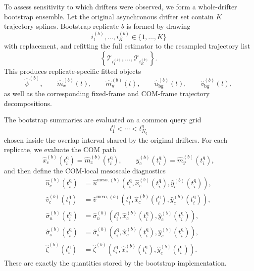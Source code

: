 \documentclass{article}
\begin{document}
To assess sensitivity to which drifters were observed, we form a
whole-drifter bootstrap ensemble. Let the original asynchronous drifter
set contain $K$ trajectory splines. Bootstrap replicate $b$ is formed by
drawing
\begin{equation}
i_1^{(b)}, \dots, i_K^{(b)} \in \{1,\dots,K\}
\end{equation}
with replacement, and refitting the full estimator to the resampled
trajectory list
\begin{equation}
\left\{\mathcal{T}_{i_1^{(b)}}, \dots, \mathcal{T}_{i_K^{(b)}}\right\}.
\end{equation}
This produces replicate-specific fitted objects
\begin{equation}
\hat{\psi}^{(b)}, \qquad \hat{m}_x^{(b)}(t), \qquad \hat{m}_y^{(b)}(t),
\qquad \hat{u}_{\mathrm{bg}}^{(b)}(t), \qquad \hat{v}_{\mathrm{bg}}^{(b)}(t),
\end{equation}
as well as the corresponding fixed-frame and COM-frame trajectory
decompositions.

The bootstrap summaries are evaluated on a common query grid
\begin{equation}
t_1^{\mathrm{q}} < \cdots < t_{N_q}^{\mathrm{q}}
\end{equation}
chosen inside the overlap interval shared by the original drifters. For
each replicate, we evaluate the COM path
\begin{equation}
\hat{x}_c^{(b)}(t_i^{\mathrm{q}})=\hat{m}_x^{(b)}(t_i^{\mathrm{q}}),
\qquad
\hat{y}_c^{(b)}(t_i^{\mathrm{q}})=\hat{m}_y^{(b)}(t_i^{\mathrm{q}}),
\end{equation}
and then define the COM-local mesoscale diagnostics
\begin{align}
\hat{u}_c^{(b)}(t_i^{\mathrm{q}})
&=
\hat{u}^{\mathrm{meso},(b)}\!\left(
t_i^{\mathrm{q}},
\hat{x}_c^{(b)}(t_i^{\mathrm{q}}),
\hat{y}_c^{(b)}(t_i^{\mathrm{q}})
\right),
\\
\hat{v}_c^{(b)}(t_i^{\mathrm{q}})
&=
\hat{v}^{\mathrm{meso},(b)}\!\left(
t_i^{\mathrm{q}},
\hat{x}_c^{(b)}(t_i^{\mathrm{q}}),
\hat{y}_c^{(b)}(t_i^{\mathrm{q}})
\right),
\\
\hat{\sigma}_n^{(b)}(t_i^{\mathrm{q}})
&=
\hat{\sigma}_n^{(b)}\!\left(
t_i^{\mathrm{q}},
\hat{x}_c^{(b)}(t_i^{\mathrm{q}}),
\hat{y}_c^{(b)}(t_i^{\mathrm{q}})
\right),
\\
\hat{\sigma}_s^{(b)}(t_i^{\mathrm{q}})
&=
\hat{\sigma}_s^{(b)}\!\left(
t_i^{\mathrm{q}},
\hat{x}_c^{(b)}(t_i^{\mathrm{q}}),
\hat{y}_c^{(b)}(t_i^{\mathrm{q}})
\right),
\\
\hat{\zeta}^{(b)}(t_i^{\mathrm{q}})
&=
\hat{\zeta}^{(b)}\!\left(
t_i^{\mathrm{q}},
\hat{x}_c^{(b)}(t_i^{\mathrm{q}}),
\hat{y}_c^{(b)}(t_i^{\mathrm{q}})
\right).
\end{align}
These are exactly the quantities stored by the bootstrap implementation.
\end{document}
